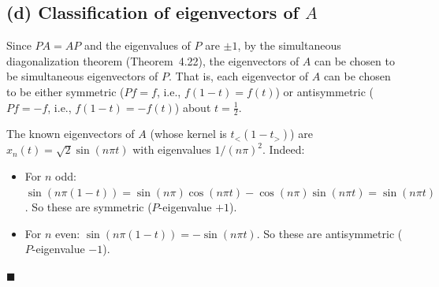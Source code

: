 \documentclass[12pt]{article}
\begin{document}
\subsection*{(d) Classification of eigenvectors of $A$}

Since $PA = AP$ and the eigenvalues of $P$ are $\pm 1$, by the simultaneous diagonalization theorem (Theorem~4.22), the eigenvectors of $A$ can be chosen to be simultaneous eigenvectors of $P$. That is, each eigenvector of $A$ can be chosen to be either symmetric ($Pf = f$, i.e., $f(1-t) = f(t)$) or antisymmetric ($Pf = -f$, i.e., $f(1-t) = -f(t)$) about $t = \tfrac{1}{2}$.

The known eigenvectors of $A$ (whose kernel is $t_<(1-t_>)$) are $x_n(t) = \sqrt{2}\sin(n\pi t)$ with eigenvalues $1/(n\pi)^2$. Indeed:
\begin{itemize}
\item For $n$ odd: $\sin(n\pi(1-t)) = \sin(n\pi)\cos(n\pi t) - \cos(n\pi)\sin(n\pi t) = \sin(n\pi t)$. So these are symmetric ($P$-eigenvalue $+1$).
\item For $n$ even: $\sin(n\pi(1-t)) = -\sin(n\pi t)$. So these are antisymmetric ($P$-eigenvalue $-1$).
\end{itemize}

\hfill $\blacksquare$
\end{document}
